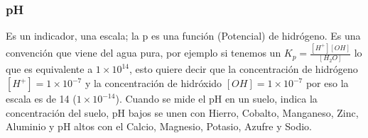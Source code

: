 \subsubsection{pH}
Es un indicador, una escala; la p es una función (Potencial) de hidrógeno. Es una convención que viene del agua pura, por ejemplo si tenemos un $K_p=\frac{\left[H^+\right]\left[OH\right]}{\left[H_2O\right]}$ lo que es equivalente a $1\times 10^{14}$, esto quiere decir que la concentración de hidrógeno $\left[H^+\right]=1\times 10^{-7}$ y la concentración de hidróxido $\left[OH\right]=1\times 10^{-7}$ por eso la escala es de 14 ($1\times 10^{-14}$).
Cuando se mide el pH en un suelo, indica la concentración del suelo, pH bajos se unen con Hierro, Cobalto, Manganeso, Zinc, Aluminio y pH altos con el Calcio, Magnesio, Potasio, Azufre y Sodio. 























